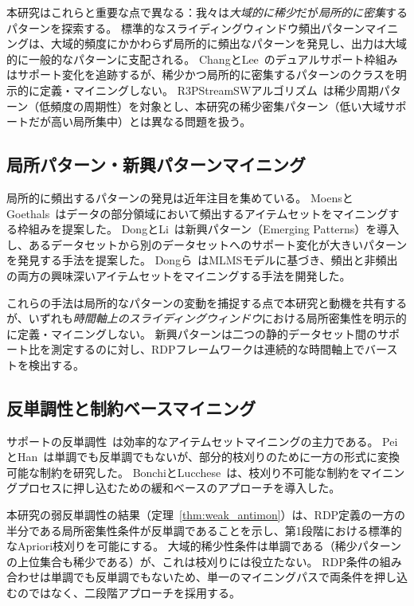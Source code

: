 本研究はこれらと重要な点で異なる：我々は\emph{大域的に稀少}だが\emph{局所的に密集}するパターンを探索する。
標準的なスライディングウィンドウ頻出パターンマイニングは、大域的頻度にかかわらず局所的に頻出なパターンを発見し、出力は大域的に一般的なパターンに支配される。
ChangとLee~\cite{chang2009dualsupport}のデュアルサポート枠組みはサポート変化を追跡するが、稀少かつ局所的に密集するパターンのクラスを明示的に定義・マイニングしない。
R3PStreamSWアルゴリズム~\cite{r3pstreamsw2025}は稀少周期パターン（低頻度の周期性）を対象とし、本研究の稀少密集パターン（低い大域サポートだが高い局所集中）とは異なる問題を扱う。

\subsection{局所パターン・新興パターンマイニング}

局所的に頻出するパターンの発見は近年注目を集めている。
MoensとGoethals~\cite{moens2013locally}はデータの部分領域において頻出するアイテムセットをマイニングする枠組みを提案した。
DongとLi~\cite{dong1999emerging}は新興パターン（Emerging Patterns）を導入し、あるデータセットから別のデータセットへのサポート変化が大きいパターンを発見する手法を提案した。
Dongら~\cite{kumar2008mlms}はMLMSモデルに基づき、頻出と非頻出の両方の興味深いアイテムセットをマイニングする手法を開発した。

これらの手法は局所的なパターンの変動を捕捉する点で本研究と動機を共有するが、いずれも\emph{時間軸上のスライディングウィンドウ}における局所密集性を明示的に定義・マイニングしない。
新興パターンは二つの静的データセット間のサポート比を測定するのに対し、RDPフレームワークは連続的な時間軸上でバーストを検出する。

\subsection{反単調性と制約ベースマイニング}

サポートの反単調性~\cite{agrawal1994apriori}は効率的なアイテムセットマイニングの主力である。
PeiとHan~\cite{pei2001convertible}は単調でも反単調でもないが、部分的枝刈りのために一方の形式に変換可能な制約を研究した。
BonchiとLucchese~\cite{bonchi2005tougher}は、枝刈り不可能な制約をマイニングプロセスに押し込むための緩和ベースのアプローチを導入した。

本研究の弱反単調性の結果（定理~\ref{thm:weak_antimon}）は、RDP定義の一方の半分である局所密集性条件が反単調であることを示し、第1段階における標準的なApriori枝刈りを可能にする。
大域的稀少性条件は単調である（稀少パターンの上位集合も稀少である）が、これは枝刈りには役立たない。
RDP条件の組み合わせは単調でも反単調でもないため、単一のマイニングパスで両条件を押し込むのではなく、二段階アプローチを採用する。

